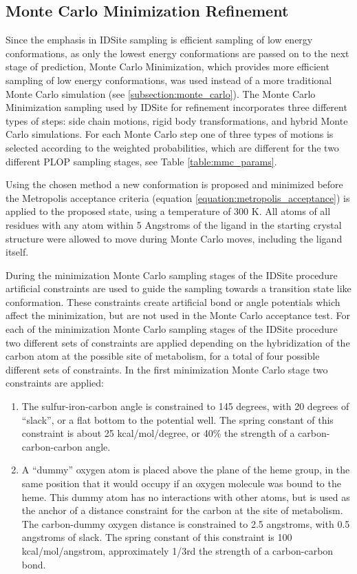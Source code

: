 \subsection{Monte Carlo Minimization Refinement}
\label{subsection:p450/mcm}
Since the emphasis in IDSite sampling is efficient sampling of low energy conformations, as only the lowest energy conformations are passed on to the next stage of prediction, Monte Carlo Minimization, which provides more efficient sampling of low energy conformations, was used instead of a more traditional Monte Carlo simulation (see \ref{subsection:monte_carlo}).
The Monte Carlo Minimization sampling used by IDSite for refinement incorporates three different types of steps: side chain motions, rigid body transformations, and hybrid Monte Carlo simulations.
For each Monte Carlo step one of three types of motions is selected according to the weighted probabilities, which are different for the two different PLOP sampling stages, see Table \ref{table:mmc_params}.

Using the chosen method a new conformation is proposed and minimized before the Metropolis acceptance criteria (equation \ref{equation:metropolis_acceptance}) is applied to the proposed state, using a temperature of 300 K.
All atoms of all residues with any atom within 5 Angstroms of the ligand in the starting crystal structure were allowed to move during Monte Carlo moves, including the ligand itself.

During the minimization Monte Carlo sampling stages of the IDSite procedure artificial constraints are used to guide the sampling towards a transition state like conformation.
These constraints create artificial bond or angle potentials which affect the minimization, but are not used in the Monte Carlo acceptance test.
For each of the minimization Monte Carlo sampling stages of the IDSite procedure two different sets of constraints are applied depending on the hybridization of the carbon atom at the possible site of metabolism, for a total of four possible different sets of constraints.
In the first minimization Monte Carlo stage two constraints are applied:
\begin{enumerate}
\item The sulfur-iron-carbon angle is constrained to 145 degrees, with 20 degrees of ``slack'', or a flat bottom to the potential well.
The spring constant of this constraint is about 25 kcal/mol/degree, or {\textapprox}40\% the strength of a carbon-carbon-carbon angle.
\item A ``dummy'' oxygen atom is placed above the plane of the heme group, in the same position that it would occupy if an oxygen molecule was bound to the heme.  
This dummy atom has no interactions with other atoms, but is used as the anchor of a distance constraint for the carbon at the site of metabolism.  
The carbon-dummy oxygen distance is constrained to 2.5 angstroms, with 0.5 angstroms of slack.
The spring constant of this constraint is 100 kcal/mol/angstrom, approximately 1/3rd the strength of a carbon-carbon bond.
\end{enumerate}

